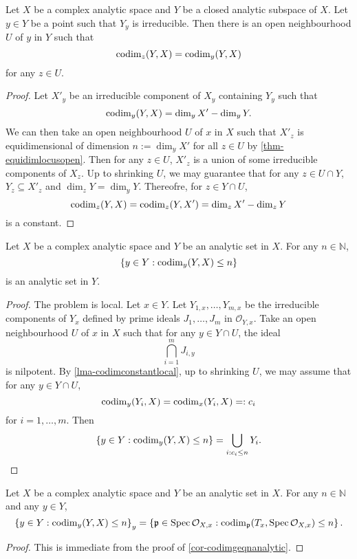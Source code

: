 \begin{lemma}\label{lma-codimconstantlocal}
    Let $X$ be a complex analytic space and $Y$ be a closed analytic subspace of $X$. Let $y\in Y$ be a point such that $Y_y$ is irreducible. Then there is an open neighbourhood $U$ of $y$ in $Y$ such that 
    \[
        \operatorname{codim}_z(Y,X)=\operatorname{codim}_y(Y,X)  
    \]
    for any $z\in U$.
\end{lemma}
\begin{proof}
    Let $X'_y$ be an irreducible component of $X_y$ containing $Y_y$ such that 
    \[
        \operatorname{codim}_y(Y,X)=\dim_y X'-\dim_y  Y.
    \]
    We can then take an open neighbourhood $U$ of $x$ in $X$ such that $X'_z$ is equidimensional of dimension $n:=\dim_y X'$ for all $z\in U$ by \cref{thm-equidimlocusopen}. Then for any $z\in U$, $X'_z$ is a union of some irreducible components of $X_z$. Up to shrinking $U$, we may guarantee that for any $z\in U\cap Y$, $Y_z\subseteq X'_z$ and $\dim_z Y=\dim_y Y$. Thereofre, for $z\in Y\cap U$,
    \[
        \operatorname{codim}_z(Y,X)=\operatorname{codim}_z(Y,X')=\dim_z X'-\dim_z Y  
    \]
    is a constant.
\end{proof}

\begin{corollary}\label{cor-codimgeqnanalytic}
    Let $X$ be a complex analytic space and $Y$ be an analytic set in $X$. For any $n\in \mathbb{N}$, 
    \[
        \left\{ y\in Y: \operatorname{codim}_y(Y,X)\leq n\right\}
    \]
    is an analytic set in $Y$.
\end{corollary}
\begin{proof}
    The problem is local. Let $x\in Y$. Let $Y_{1,x},\ldots,Y_{m,x}$ be the irreducible components of $Y_x$ defined by prime ideals $J_1,\ldots,J_m$ in $\mathcal{O}_{Y,x}$. Take an open neighbourhood $U$ of $x$ in $X$ such that for any $y\in Y\cap U$, the ideal 
    \[
        \bigcap_{i=1}^m J_{i,y}  
    \]
    is nilpotent. By \cref{lma-codimconstantlocal}, up to shrinking $U$, we may assume that for any $y\in Y\cap U$,
    \[
        \operatorname{codim}_y(Y_i,X)=\operatorname{codim}_x(Y_i,X)=:c_i  
    \]
    for $i=1,\ldots,m$. Then 
    \[
        \left\{ y\in Y: \operatorname{codim}_y(Y,X)\leq n\right\}=\bigcup_{i:c_i\leq n} Y_i.  
    \]
\end{proof}

\begin{corollary}\label{cor-codimgeqngerm}
    Let $X$ be a complex analytic space and $Y$ be an analytic set in $X$. For any $n\in \mathbb{N}$ and any $y\in Y$,
    \[
        \left\{ y\in Y: \operatorname{codim}_y(Y,X)\leq n\right\}_y=\left\{\mathfrak{p}\in \operatorname{Spec} \mathcal{O}_{X,x}: \operatorname{codim}_{\mathfrak{p}}(T_x,\operatorname{Spec} \mathcal{O}_{X,x})\leq n \right\}.
    \]
\end{corollary}
\begin{proof}
    This is immediate from the proof of \cref{cor-codimgeqnanalytic}.
\end{proof}




